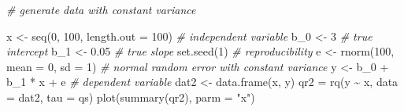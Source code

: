 \documentclass[
]{book}
\newenvironment{Shaded}{\begin{snugshade}}{\end{snugshade}}
\newcommand{\AttributeTok}[1]{\textcolor[rgb]{0.77,0.63,0.00}{#1}}
\newcommand{\CommentTok}[1]{\textcolor[rgb]{0.56,0.35,0.01}{\textit{#1}}}
\newcommand{\DecValTok}[1]{\textcolor[rgb]{0.00,0.00,0.81}{#1}}
\newcommand{\FloatTok}[1]{\textcolor[rgb]{0.00,0.00,0.81}{#1}}
\newcommand{\FunctionTok}[1]{\textcolor[rgb]{0.00,0.00,0.00}{#1}}
\newcommand{\NormalTok}[1]{#1}
\newcommand{\OtherTok}[1]{\textcolor[rgb]{0.56,0.35,0.01}{#1}}
\newcommand{\SpecialCharTok}[1]{\textcolor[rgb]{0.00,0.00,0.00}{#1}}
\newcommand{\StringTok}[1]{\textcolor[rgb]{0.31,0.60,0.02}{#1}}
\begin{document}
\begin{Shaded}
\begin{Highlighting}[]
\CommentTok{\# generate data with constant variance}

\NormalTok{x }\OtherTok{\textless{}{-}} \FunctionTok{seq}\NormalTok{(}\DecValTok{0}\NormalTok{, }\DecValTok{100}\NormalTok{, }\AttributeTok{length.out =} \DecValTok{100}\NormalTok{)    }\CommentTok{\# independent variable}
\NormalTok{b\_0 }\OtherTok{\textless{}{-}} \DecValTok{3}                              \CommentTok{\# true intercept}
\NormalTok{b\_1 }\OtherTok{\textless{}{-}} \FloatTok{0.05}                           \CommentTok{\# true slope}
\FunctionTok{set.seed}\NormalTok{(}\DecValTok{1}\NormalTok{)                           }\CommentTok{\# reproducibility}
\NormalTok{e }\OtherTok{\textless{}{-}} \FunctionTok{rnorm}\NormalTok{(}\DecValTok{100}\NormalTok{, }\AttributeTok{mean =} \DecValTok{0}\NormalTok{, }\AttributeTok{sd =} \DecValTok{1}\NormalTok{)     }\CommentTok{\# normal random error with constant variance}
\NormalTok{y }\OtherTok{\textless{}{-}}\NormalTok{ b\_0 }\SpecialCharTok{+}\NormalTok{ b\_1 }\SpecialCharTok{*}\NormalTok{ x }\SpecialCharTok{+}\NormalTok{ e                }\CommentTok{\# dependent variable}
\NormalTok{dat2 }\OtherTok{\textless{}{-}} \FunctionTok{data.frame}\NormalTok{(x, y)}
\NormalTok{qr2 }\OtherTok{=} \FunctionTok{rq}\NormalTok{(y }\SpecialCharTok{\textasciitilde{}}\NormalTok{ x, }\AttributeTok{data =}\NormalTok{ dat2, }\AttributeTok{tau =}\NormalTok{ qs)}
\FunctionTok{plot}\NormalTok{(}\FunctionTok{summary}\NormalTok{(qr2), }\AttributeTok{parm =} \StringTok{"x"}\NormalTok{)}
\end{Highlighting}
\end{Shaded}


  
\end{document}
